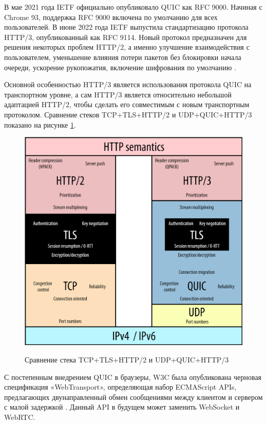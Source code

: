 В мае 2021 года IETF официально опубликовало QUIC как RFC 9000. Начиная с Chrome 93, поддержка RFC 9000 включена по умолчанию для всех пользователей. В июне 2022 года IETF выпустила стандартизацию протокола HTTP/3, опубликованный как RFC 9114. Новый протокол предназначен для решения некоторых проблем HTTP/2, а именно улучшение взаимодействия с пользователем, уменьшение влияния потери пакетов без блокировки начала очереди, ускорение рукопожатия, включение шифрования по умолчанию \cite{rfc9114}.

Основной особенностью HTTP/3 является использования протокола QUIC на транспортном уровне, а сам HTTP/3 является относительно небольшой адаптацией HTTP/2, чтобы сделать его совместимым с новым транспортным протоколом. Сравнение стеков TCP+TLS+HTTP/2 и UDP+QUIC+HTTP/3 показано на рисунке \ref{fig:protocol-stack}.

\begin{figure}[H]
\begin{center}
\includegraphics[width=1.0\hsize]{fig/protocol-stack.png}\\[2mm]
\caption{Сравнение стека TCP+TLS+HTTP/2 и UDP+QUIC+HTTP/3}\label{fig:protocol-stack}
\end{center}
\end{figure}

С постепенным внедрением QUIC в браузеры, W3C была опубликована черновая спецификация «WebTransport», определяющая набор ECMAScript APIs, предлагающих двунаправленный обмен сообщениями между клиентом и сервером с малой задержкой \cite{WebTransport}. Данный API в будущем может заменить WebSocket и WebRTC.

